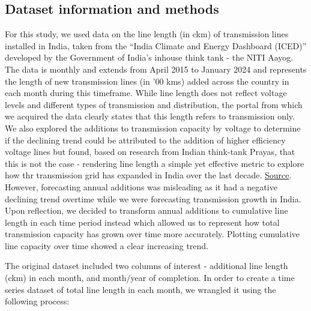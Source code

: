 \documentclass[
]{article}
\begin{document}
\hypertarget{dataset-information-and-methods}{%
\subsection{Dataset information and
methods}\label{dataset-information-and-methods}}

For this study, we used data on the line length (in ckm) of transmission
lines installed in India, taken from the ``India Climate and Energy
Dashboard (ICED)'' developed by the Government of India's inhouse think
tank - the NITI Aayog. The data is monthly and extends from April 2015
to January 2024 and represents the length of new transmission lines (in
'00 kms) added across the country in each month during this timeframe.
While line length does not reflect voltage levels and different types of
transmission and distribution, the portal from which we acquired the
data clearly states that this length refers to transmission only. We
also explored the additions to transmission capacity by voltage to
determine if the declining trend could be attributed to the addition of
higher efficiency voltage lines but found, based on research from Indian
think-tank Prayas, that this is not the case - rendering line length a
simple yet effective metric to explore how thr transmission grid has
expanded in India over the last decade.
\href{https://indiatransmission.org/transmission-line}{Source}. However,
forecasting annual additions was misleading as it had a negative
declining trend overtime while we were forecasting transmission growth
in India. Upon reflection, we decided to transform annual additions to
cumulative line length in each time period instead which allowed us to
represent how total transmission capacity has grown over time more
accurately. Plotting cumulative line capacity over time showed a clear
increasing trend.

The original dataset included two columns of interest - additional line
length (ckm) in each month, and month/year of completion. In order to
create a time series dataset of total line length in each month, we
wrangled it using the following process:
\end{document}

